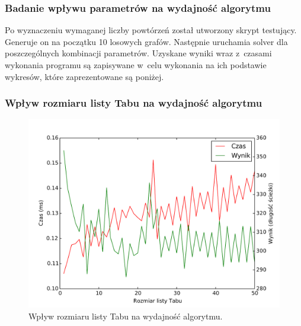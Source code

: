 \documentclass[11pt,a4paper]{article}
\begin{document}
\subsubsection{Badanie wpływu parametrów na wydajność algorytmu}
Po wyznaczeniu wymaganej liczby powtórzeń został utworzony skrypt testujący. Generuje on na początku 10 losowych grafów. Następnie uruchamia solver dla poszczególnych kombinacji parametrów. Uzyskane wyniki wraz z~czasami wykonania programu są zapisywane w~celu wykonania na ich podstawie wykresów, które zaprezentowane są poniżej.

\subsubsection{Wpływ rozmiaru listy Tabu na wydajność algorytmu}
\begin{figure}[H]
\includegraphics[trim = 0mm 2mm 0mm 12mm, clip, width=14cm]{graphs/tabuListSize.pdf}
\caption{Wpływ rozmiaru listy Tabu na wydajność algorytmu.}
\end{figure}
\end{document}
